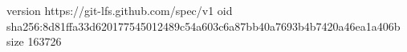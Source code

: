version https://git-lfs.github.com/spec/v1
oid sha256:8d81ffa33d620177545012489c54a603c6a87bb40a7693b4b7420a46ea1a406b
size 163726
